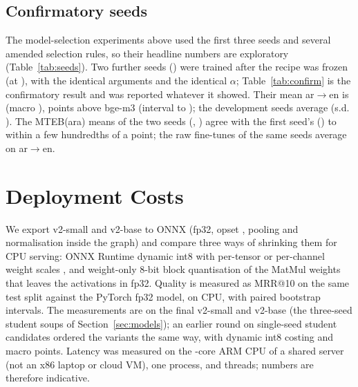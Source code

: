 \documentclass[11pt]{article}
\newcommand{\tabfont}{\footnotesize\setlength{\tabcolsep}{3.2pt}}
\newcommand{\ardir}{ar$\to$en}
\begin{document}
\subsection{Confirmatory seeds}
The model-selection experiments above used the first three seeds and several amended selection rules, so their headline numbers are exploratory (Table~\ref{tab:seeds}).
Two further seeds (\NumConfSeeds) were trained after the recipe was frozen (at \NumConfFrozen), with the identical arguments and the identical $\alpha$; Table~\ref{tab:confirm} is the confirmatory result and was reported whatever it showed.
Their mean \ardir{} is \NumConfArEnMean{} (macro \NumConfMacroMean), \NumConfDeltaArEn{} points above bge-m3 (interval \NumConfDeltaArEnLo{} to \NumConfDeltaArEnHi); the development seeds average \NumSeedWiseArEn{} (s.d. \NumSeedWiseSd).
The MTEB(ara) means of the two seeds (\NumMtebSixteenSeedTask{}, \NumMtebSeventeenSeedTask) agree with the first seed's (\NumMtebVTwoMTask{}) to within a few hundredths of a point; the raw fine-tunes of the same seeds average \NumConfRawArEnMean{} on \ardir{}.

\begin{table}[t]
\centering\tabfont
{}
\caption{Development seeds (test): the raw fine-tune, the recipe of the pick and the two distilled students.}\label{tab:seeds}
\end{table}

\begin{table}[t]
\centering\tabfont
{}
\caption{Confirmatory seeds, trained after the recipe was frozen (test). Intervals: paired bootstrap over queries against bge-m3 (for the mean row, of the seed-averaged per-query scores).}\label{tab:confirm}
\end{table}

\section{Deployment Costs}\label{sec:deploy}
We export v2-small and v2-base to ONNX (fp32, opset \NumOpset, pooling and normalisation inside the graph) and compare three ways of shrinking them for CPU serving:
ONNX Runtime dynamic int8 with per-tensor or per-channel weight scales \citep[activations quantised on the fly, cf.][]{zafrir2019q8bert}, and weight-only 8-bit block quantisation of the MatMul weights that leaves the activations in fp32.
Quality is measured as MRR@10 on the same test split against the PyTorch fp32 model, on CPU, with paired bootstrap intervals.
The measurements are on the final v2-small and v2-base (the three-seed student soups of Section~\ref{sec:models}); an earlier round on single-seed student candidates ordered the variants the same way, with dynamic int8 costing \NumRoundOneDynSmall{} and \NumRoundOneDynBase{} macro points.
Latency was measured on the \NumSparkCpus-core ARM CPU of a shared server (not an x86 laptop or cloud VM), one process, \NumThreadsLow{} and \NumThreadsHigh{} threads; numbers are therefore indicative.
\end{document}
